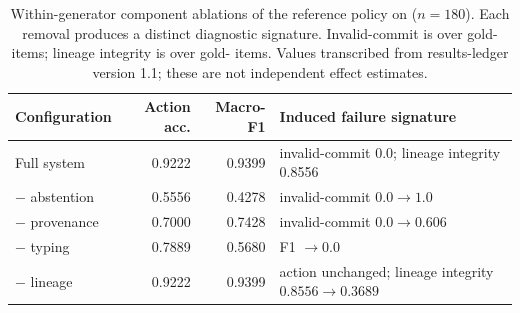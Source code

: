 \begin{table}[t]
\centering
\small
\caption{Within-generator component ablations of the reference policy on \mgp{}
($n{=}180$). Each removal produces a distinct diagnostic signature.
Invalid-commit is over gold-\abstain{} items; lineage integrity is over
gold-\supersede{} items. Values transcribed from
results-ledger version 1.1; these are not independent effect estimates.}
\label{tab:ablation}
\begin{tabular}{@{}l r r l@{}}
\toprule
Configuration & Action acc. & Macro-F1 & Induced failure signature \\
\midrule
Full system        & 0.9222 & 0.9399 & invalid-commit 0.0; lineage integrity 0.8556 \\
$-$ abstention      & 0.5556 & 0.4278 & invalid-commit $0.0 \to 1.0$ \\
$-$ provenance      & 0.7000 & 0.7428 & invalid-commit $0.0 \to 0.606$ \\
$-$ typing          & 0.7889 & 0.5680 & \keep{} F1 $\to 0.0$ \\
$-$ lineage         & 0.9222 & 0.9399 & action unchanged; lineage integrity $0.8556 \to 0.3689$ \\
\bottomrule
\end{tabular}
\end{table}
